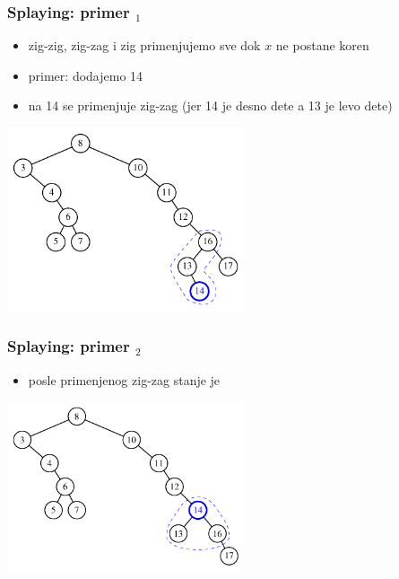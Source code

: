 \documentclass[compress]{beamer}
\begin{document}
\begin{frame}[fragile]
  \frametitle{Splaying: primer $_1$}
  \begin{itemize}
    \item zig-zig, zig-zag i zig primenjujemo sve dok $x$ ne postane koren
    \item primer: dodajemo 14
    \item na 14 se primenjuje zig-zag (jer 14 je desno dete a 13 je levo dete)
  \end{itemize}
  \begin{center}
    \includegraphics[width=7cm]{asp-11-pic21.pdf}
  \end{center}
\end{frame}

\begin{frame}[fragile]
  \frametitle{Splaying: primer $_2$}
  \begin{itemize}
    \item posle primenjenog zig-zag stanje je
  \end{itemize}
  \begin{center}
    \includegraphics[width=7cm]{asp-11-pic22.pdf}
  \end{center}
\end{frame}
\end{document}
